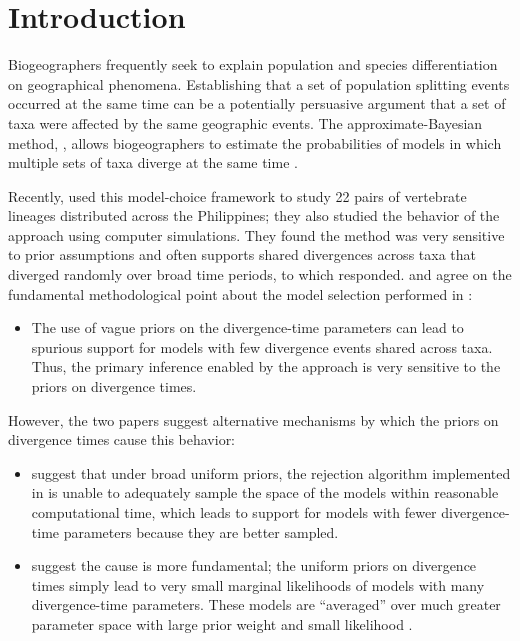 \section{Introduction}
Biogeographers frequently seek to explain population and species
differentiation on geographical phenomena.
Establishing that a set of population splitting events occurred
at the same time can be a potentially persuasive argument that a set of taxa
were affected by the same geographic events.
The approximate-Bayesian method, \msb, allows biogeographers to estimate the
probabilities of models in which multiple sets of taxa diverge at the same
time \citep{Hickerson2006,Huang2011}.

Recently, \citet{Oaks2012} used this model-choice framework to study 22 pairs
of vertebrate lineages distributed across the Philippines; they also studied
the behavior of the \msb approach using computer simulations.
They found the method was very sensitive to prior assumptions and often
supports shared divergences across taxa that diverged randomly over broad time
periods, to which \citet{Hickerson2013} responded.
\citet{Oaks2012} and \citet{Hickerson2013} agree on the fundamental
methodological point about the model selection performed in \msb:
\begin{itemize}
   \item The use of vague priors on the divergence-time parameters can lead to
       spurious support for models with few divergence events shared across
       taxa. Thus, the primary inference enabled by the approach is very
       sensitive to the priors on divergence times.
\end{itemize}
However, the two papers suggest alternative mechanisms by which the priors on
divergence times cause this behavior:
\begin{itemize}
    \item \citet{Hickerson2013} suggest that under broad uniform priors, the
        rejection algorithm implemented in \msb is unable to adequately sample
        the space of the models within reasonable computational time, which
        leads to support for models with fewer divergence-time parameters
        because they are better sampled.
    \item \citet{Oaks2012} suggest the cause is more fundamental; the uniform
        priors on divergence times simply lead to very small marginal
        likelihoods of models with many divergence-time parameters. These
        models are ``averaged'' over much greater parameter space with large
        prior weight and small likelihood \citep{Jeffreys1939,Lindley1957}.
\end{itemize}
